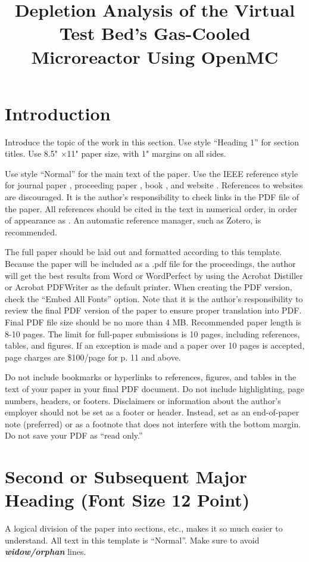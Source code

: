 \documentclass[letterpaper]{physor2024}
\title{Depletion Analysis of the Virtual Test Bed's Gas-Cooled Microreactor Using OpenMC}
\begin{document}
\section{Introduction}\label{sec:1}
Introduce the topic of the work in this section.
Use style ``Heading 1'' for section titles. Use 8.5" ×11" paper size, with 1" margins on all sides.

Use style ``Normal'' for the main text of the paper.
Use the IEEE reference style for journal paper \cite{journal}, proceeding paper \cite{conf_paper}, book \cite{book}, and website \cite{website}.
References to websites are discouraged. It is the author’s responsibility to check links in the PDF file of the paper.
All references should be cited in the text in numerical order, in order of appearance as \cite{book,website,proc_paper}. An automatic reference manager, such as Zotero, is recommended.

The full paper should be laid out and formatted according to this template.
Because the paper will be included as a .pdf file for the proceedings, the author will get the best results from Word or WordPerfect by using the Acrobat Distiller or Acrobat PDFWriter as the default printer.
When creating the PDF version, check the ``Embed All Fonts'' option.
Note that it is the author's responsibility to review the final PDF version of the paper to ensure proper translation into PDF.
Final PDF file size should be no more than 4 MB.
Recommended paper length is 8-10 pages.
The limit for full-paper submissions is 10 pages, including references, tables, and figures.
If an exception is made and a paper over 10 pages is accepted, page charges are \$100/page for p. 11 and above.

Do not include bookmarks or hyperlinks to references, figures, and tables in the text of your paper in your final PDF document.
Do not include highlighting, page numbers, headers, or footers.
Disclaimers or information about the author’s employer should not be set as a footer or header.
Instead, set as an end-of-paper note (preferred) or as a footnote that does not interfere with the bottom margin. Do not save your PDF as ``read only.''


\section{Second or Subsequent Major Heading (Font Size 12 Point)} \label{sec:2}

A logical division of the paper into sections, etc., makes it so much easier to understand. All text in this template is ``Normal''.
Make sure to avoid \textbf{\textit{widow/orphan}}  lines.
\end{document}
